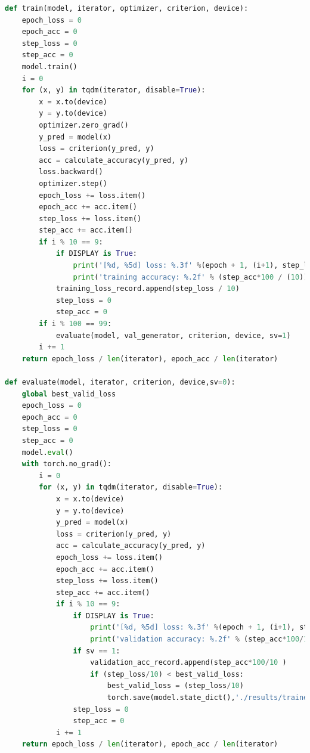 \documentclass[3p,times,procedia]{elsarticle}
\begin{document}
\begin{lstlisting}[language=Python]
def train(model, iterator, optimizer, criterion, device):
    epoch_loss = 0
    epoch_acc = 0
    step_loss = 0
    step_acc = 0
    model.train()
    i = 0
    for (x, y) in tqdm(iterator, disable=True):
        x = x.to(device)
        y = y.to(device)
        optimizer.zero_grad()
        y_pred = model(x)
        loss = criterion(y_pred, y)
        acc = calculate_accuracy(y_pred, y)
        loss.backward()
        optimizer.step()
        epoch_loss += loss.item()
        epoch_acc += acc.item()
        step_loss += loss.item()
        step_acc += acc.item()
        if i % 10 == 9:
            if DISPLAY is True:                                                          # print every 10 mini-batches
                print('[%d, %5d] loss: %.3f' %(epoch + 1, (i+1), step_loss / 10))    # each epoch has 5000/50 = 100 steps
                print('training accuracy: %.2f' % (step_acc*100 / (10)) )            # printed at 10 step intervals
            training_loss_record.append(step_loss / 10)                          # save training loss with 10 step intervals
            step_loss = 0
            step_acc = 0 
        if i % 100 == 99:
            evaluate(model, val_generator, criterion, device, sv=1)
        i += 1      
    return epoch_loss / len(iterator), epoch_acc / len(iterator)

def evaluate(model, iterator, criterion, device,sv=0):
    global best_valid_loss
    epoch_loss = 0
    epoch_acc = 0
    step_loss = 0
    step_acc = 0
    model.eval()
    with torch.no_grad():
        i = 0
        for (x, y) in tqdm(iterator, disable=True):
            x = x.to(device)
            y = y.to(device)
            y_pred = model(x)
            loss = criterion(y_pred, y)
            acc = calculate_accuracy(y_pred, y)
            epoch_loss += loss.item()
            epoch_acc += acc.item()
            step_loss += loss.item()
            step_acc += acc.item()
            if i % 10 == 9:
                if DISPLAY is True:                                                      # print every 10 mini-batches
                    print('[%d, %5d] loss: %.3f' %(epoch + 1, (i+1), step_loss/10))    # each epoch has 5000/50 = 100 steps
                    print('validation accuracy: %.2f' % (step_acc*100/10) )          # printed at 10 step intervals
                if sv == 1:
                    validation_acc_record.append(step_acc*100/10 )                      # save validation accuracy with 10 step intervals
                    if (step_loss/10) < best_valid_loss:
                        best_valid_loss = (step_loss/10)
                        torch.save(model.state_dict(),'./results/trained_models/'+ model_name+'[scheduled].pt')
                step_loss = 0
                step_acc = 0
            i += 1
    return epoch_loss / len(iterator), epoch_acc / len(iterator)


\end{lstlisting}
\end{document}
